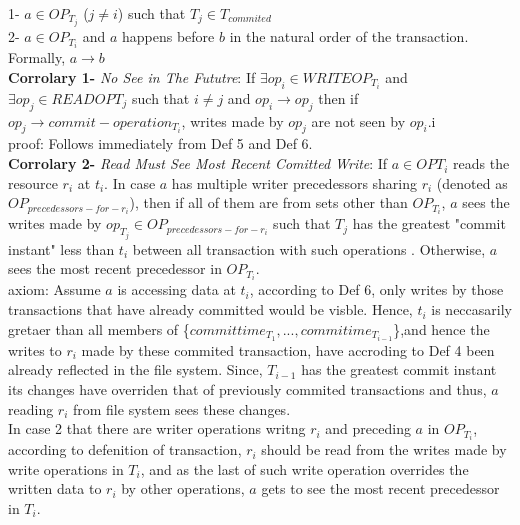 \documentclass[a4paper, 11pt]{article}
\begin{document}
\hspace{7mm} 1- $a \in OP_{T_j}$ ($j \neq i$) such that $T_j \in T_{commited}$ \\

\hspace{7mm} 2- $a \in OP_{T_i}$ and $a$ happens before $b$ in the natural order of the transaction. Formally, $a \rightarrow b$\\
 

\textbf{Corrolary 1-} \emph{No See in The Fututre}: If $ \exists op_i \in WRITEOP_{T_i}$ and $\exists op_j \in READOP{T_j}$ such that $i \neq j$ and $op_i \rightarrow op_j$ then if $op_j \rightarrow commit-operation_{T_i}$, writes made by $op_j$ are not seen by $op_i$.i\\

proof: Follows immediately from Def 5 and Def 6.\\

\textbf{Corrolary 2-} \emph{Read Must See Most Recent Comitted Write}: If $a \in OP{T_i}$ reads the resource $r_i$ at $t_i$. In case $a$ has multiple writer precedessors sharing $r_i$ (denoted as $OP_{precedessors-for-r_i}$), then if all of them are from sets other than $OP_{T_i}$, $a$ sees the writes made by $op_{T_j} \in OP_{precedessors-for-r_i}$ such that $T_j$ has the greatest "commit instant" less than $t_i$ between all transaction with such operations . Otherwise, $a$ sees the most recent precedessor in $OP_{T_i}$. \\

axiom: Assume $a$ is accessing data at $t_i$, according to Def 6, only writes by those transactions that have already committed would be visble. Hence, $t_i$ is neccasarily gretaer than all members of \{$committime_{T_1}, ..., commitime_{T_{i-1}}$\},and hence the writes to $r_i$ made by these commited transaction, have accroding to Def 4 been already reflected in the file system. Since, $T_{i-1}$ has the greatest commit instant its changes have overriden that of previously commited transactions and thus, $a$ reading $r_i$ from file system sees these changes.\\

In case 2 that there are writer operations writng $r_i$ and preceding $a$ in $OP_{T_i}$, according to defenition of transaction, $r_i$ should be read from the writes made by write operations in $T_i$, and as the last of such write operation overrides the written data to $r_i$ by other operations, $a$ gets to see the most recent precedessor in $T_i$.\\   
\end{document}
